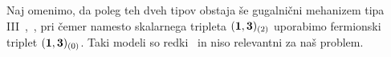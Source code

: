 Naj omenimo, da poleg teh dveh tipov obstaja še gugalnični mehanizem tipa III~\cite{nugut},~\cite{strumia},
pri čemer namesto skalarnega tripleta $(\mathbf{1}, \mathbf{3})_{(2)}$ uporabimo fermionski triplet $(\mathbf{1}, \mathbf{3})_{(0)}$. Taki
modeli so redki~\cite{strumia} in niso relevantni za naš problem.













































